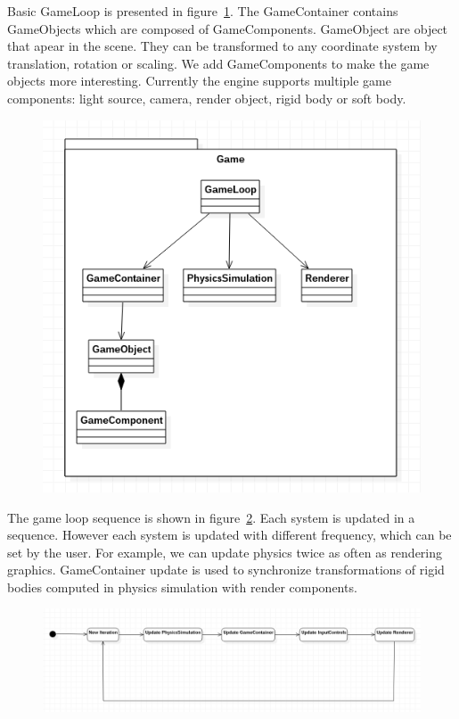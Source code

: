 \documentclass[en]{minipw} %
\begin{document}
Basic GameLoop is presented in figure~\ref{fig:ifx_game1}. The GameContainer contains GameObjects which are composed of GameComponents. GameObject are object that apear in the scene. They can be transformed to any coordinate system by translation, rotation or scaling. We add GameComponents to make the game objects more interesting. Currently the engine supports multiple game components: light source, camera, render object, rigid body or soft body.

\begin{figure}[h!]
\centering
\includegraphics[scale=0.5]{pictures/ifx_game.png}
\caption[Logo MiNI]{}
\label{fig:ifx_game1}
\end{figure}

The game loop sequence is shown in figure~\ref{fig:ifx_game_loop}. Each system is updated in a sequence. However each system is updated with different frequency, which can be set by the user. For example, we can update physics twice as often as rendering graphics. GameContainer update is used to synchronize transformations of rigid bodies computed in physics simulation with render components.

\begin{figure}[h!]
\centering
\includegraphics[scale=0.4]{pictures/game_loop.png}
\caption[Logo MiNI]{}
\label{fig:ifx_game_loop}
\end{figure}
\end{document}
